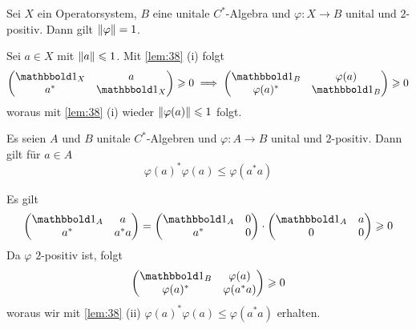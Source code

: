\begin{proposition}[label=prop:39]
	Sei $X$ ein Operatorsystem, $B$ eine unitale $C^*$-Algebra und $\varphi \colon X \to B$ unital und $2$-positiv.
	Dann gilt $\norm*{\varphi}=1$.
\end{proposition}
\begin{beweis}
	Sei $a \in X$ mit $\norm*{a} \le 1$. Mit \autoref{lem:38} (i) folgt 
	\[
		\begin{pmatrix}
			\ind_{X} & a \\ a^* & \ind_X
		\end{pmatrix} \ge 0 \implies \begin{pmatrix}
			\ind_B & \varphi(a) \\ \varphi(a)^* & \ind_B
		\end{pmatrix} \ge 0
	\]
	woraus mit \autoref{lem:38} (i) wieder $\norm*{\varphi(a)} \le 1$ folgt.
\end{beweis}

\begin{proposition}[{name={Cauchy-Schwarz}},label=prop:310]
	Es seien $A$ und $B$ unitale $C^*$-Algebren und $\varphi \colon A \to B$ unital und $2$-positiv.
	Dann gilt für $a \in A$
	\[
		\varphi(a)^* \varphi(a) \le \varphi(a^* a)
	\]
\end{proposition}
\begin{beweis}
	Es gilt
	\[
		\begin{pmatrix}
			\ind_A & a \\ a^* & a^* a
		\end{pmatrix} 
		=
		\begin{pmatrix}
			\ind_A & 0  \\ a^* & 0
		\end{pmatrix} \cdot 
		\begin{pmatrix}
			\ind_A & a \\ 0 & 0
		\end{pmatrix} \ge 0
	\]
	Da $\varphi$ $2$-positiv ist, folgt
	\[
		\begin{pmatrix}
			\ind_B & \varphi(a) \\ \varphi(a)^* & \varphi(a^* a) 
		\end{pmatrix} \ge 0
	\]
	woraus wir mit \autoref{lem:38} (ii) $\varphi(a)^* \varphi(a) \le \varphi(a^* a)$ erhalten.
\end{beweis}

